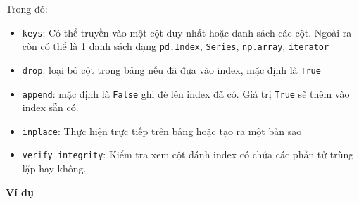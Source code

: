 \documentclass[
]{book}
\begin{document}
Trong đó:

\begin{itemize}
\item
  \texttt{keys}: Có thể truyền vào một cột duy nhất hoặc danh sách các cột. Ngoài ra còn có thể là 1 danh sách dạng \texttt{pd.Index}, \texttt{Series}, \texttt{np.array}, \texttt{iterator}
\item
  \texttt{drop}: loại bỏ cột trong bảng nếu đã đưa vào index, mặc định là \texttt{True}
\item
  \texttt{append}: mặc định là \texttt{False} ghi đè lên index đã có. Giá trị \texttt{True} sẽ thêm vào index sẵn có.
\item
  \texttt{inplace}: Thực hiện trực tiếp trên bảng hoặc tạo ra một bản sao
\item
  \texttt{verify\_integrity}: Kiểm tra xem cột đánh index có chứa các phần tử trùng lặp hay không.
\end{itemize}

\textbf{Ví dụ}
\end{document}

